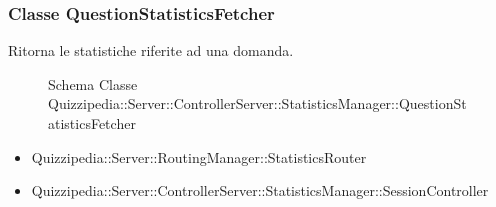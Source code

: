 \subsubsection{Classe QuestionStatisticsFetcher}
Ritorna le statistiche riferite ad una domanda.
\begin{figure}[H]
\centering
\noindent{}
\caption[Schema Classe QuestionStatisticsFetcher]{Schema Classe Quizzipedia::Server::ControllerServer::StatisticsManager::QuestionStatisticsFetcher}
\end{figure}
\begin{itemize}
\item Quizzipedia::Server::RoutingManager::StatisticsRouter
\end{itemize}
\begin{itemize}
\item Quizzipedia::Server::ControllerServer::StatisticsManager::SessionController
\end{itemize}
